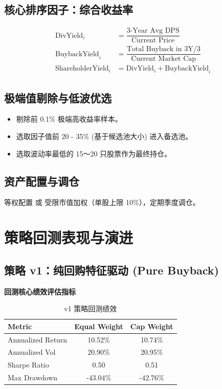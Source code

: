 \documentclass[10pt,a4paper]{ctexart}
\begin{document}
\subsection{核心排序因子：综合收益率}
\begin{align*}
\text{DivYield}_i &= \dfrac{\text{3-Year Avg DPS}}{\text{Current Price}} \\
\text{BuybackYield}_i &= \dfrac{\text{Total Buyback in 3Y}/3}{\text{Current Market Cap}} \\
\text{ShareholderYield}_i &= \text{DivYield}_i + \text{BuybackYield}_i
\end{align*}

\subsection{极端值剔除与低波优选}
\begin{itemize}
    \item 剔除前 0.1\% 极端高收益率样本。
    \item 选取因子值前 20 - 35\% (基于候选池大小) 进入备选池。
    \item 选取波动率最低的 15～20 只股票作为最终持仓。
\end{itemize}

\subsection{资产配置与调仓}
等权配置 或 受限市值加权（单股上限 10\%），定期季度调仓。

\section{策略回测表现与演进}

\subsection{策略 v1：纯回购特征驱动 (Pure Buyback)}

\textbf{回测核心绩效评估指标}

\begin{table}[htbp]
\centering
\caption{v1 策略回测绩效}
\begin{tabular}{lcc}
\toprule
Metric & Equal Weight & Cap Weight \\
\midrule
Annualized Return & 10.52\% & 10.74\% \\
Annualized Vol    & 20.90\% & 20.95\% \\
Sharpe Ratio      & 0.50    & 0.51    \\
Max Drawdown      & -43.04\% & -42.76\% \\
\bottomrule
\end{tabular}
\end{table}
\end{document}
